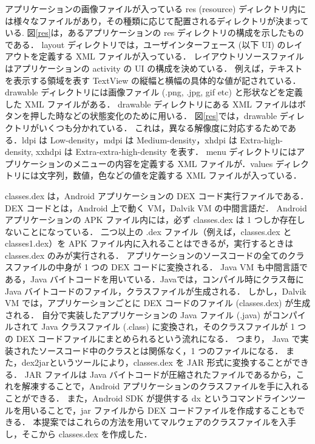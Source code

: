 アプリケーションの画像ファイルが入っている res (resource) ディレクトリ内には様々なファイルがあり，その種類に応じて配置されるディレクトリが決まっている\cite{resource}.
図\ref{res}は，あるアプリケーションの res ディレクトリの構成を示したものである．
layout  ディレクトリでは，ユーザインターフェース (以下 UI) のレイアウトを定義する XML ファイルが入っている．
レイアウトリソースファイルはアプリケーションの activity の UI の構成を決めている．
例えば，テキストを表示する領域を表す TextView の縦幅と横幅の具体的な値が記されている．
drawable ディレクトリには画像ファイル (.png, .jpg, gif etc) と形状などを定義した XML ファイルがある．
drawable ディレクトリにある XML ファイルはボタンを押した時などの状態変化のために用いる．
図\ref{res}では，drawable ディレクトリがいくつも分かれている．
これは，異なる解像度に対応するためである．ldpi は Low-density，mdpi は Medium-density，xhdpi は Extra-high-density, xxhdpi は Extra-extra-high-density を表す．
menu ディレクトリにはアプリケーションのメニューの内容を定義する XML ファイルが．values  ディレクトリには文字列，数値，色などの値を定義する XML ファイルが入っている．

classes.dex は，Android アプリケーションの DEX コード実行ファイルである．
DEX コードとは，Android 上で動く VM，Dalvik VM の中間言語だ．
Android アプリケーションの APK ファイル内には，必ず classes.dex は 1 つしか存在しないことになっている．
二つ以上の .dex ファイル（例えば，classes.dex と classes1.dex）を APK ファイル内に入れることはできるが，実行するときは classes.dex のみが実行される．
アプリケーションのソースコードの全てのクラスファイルの中身が 1 つの DEX コードに変換される．
Java VM も中間言語である，Java バイトコードを用いている．Javaでは，コンパイル時にクラス毎に Java バイトコードのファイル，クラスファイルが生成される．
しかし，Dalvik VM では，アプリケーションごとに DEX コードのファイル (classes.dex) が生成される．
自分で実装したアプリケーションの Java ファイル (.java) がコンパイルされて Java クラスファイル (.class) に変換され，そのクラスファイルが 1 つの DEX コードファイルにまとめられるという流れになる．
つまり， Java で実装されたソースコード中のクラスとは関係なく，1 つのファイルになる．
また，dex2jar\cite{d2jar}というツールにより，classes.dex を JAR 形式に変換することができる．
JAR ファイルは Java バイトコードが圧縮されたファイルであるから，これを解凍することで，Android アプリケーションのクラスファイルを手に入れることができる．
また，Android SDK が提供する dx というコマンドラインツールを用いることで，jar ファイルから DEX コードファイルを作成することもできる．
本提案ではこれらの方法を用いてマルウェアのクラスファイルを入手し，そこから  classes.dex を作成した．


